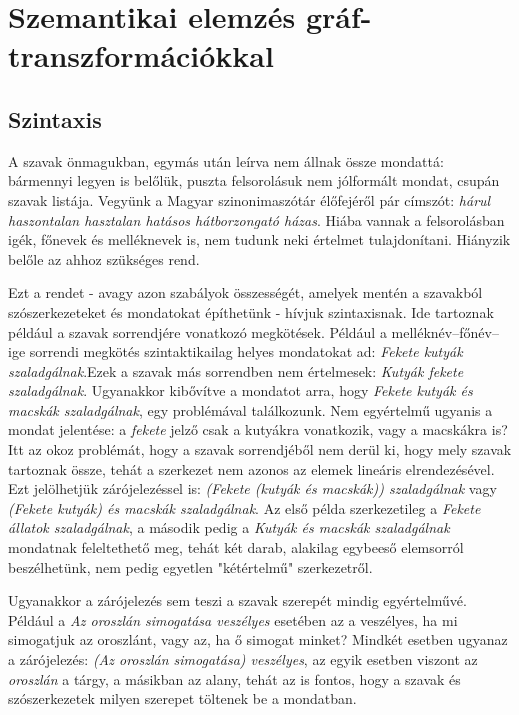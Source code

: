 \chapter{Szemantikai elemzés gráf-transzformációkkal}
\label{sec:spwgt}
\section{Szintaxis}
\label{sec:syntax}
A szavak önmagukban, egymás után leírva nem állnak össze mondattá: bármennyi legyen is belőlük, puszta felsorolásuk nem jólformált mondat, csupán szavak listája. Vegyünk a Magyar szinonimaszótár élőfejéről pár címszót: \textit{hárul haszontalan hasztalan hatásos hátborzongató házas}. Hiába vannak a felsorolásban igék, főnevek és melléknevek is, nem tudunk neki értelmet tulajdonítani. Hiányzik belőle az ahhoz szükséges rend.

Ezt a rendet - avagy azon szabályok összességét, amelyek mentén a szavakból szószerkezeteket és mondatokat építhetünk - hívjuk szintaxisnak. Ide tartoznak például a szavak sorrendjére vonatkozó megkötések.
Például a melléknév–főnév–ige sorrendi megkötés szintaktikailag helyes mondatokat ad: \textit{Fekete kutyák szaladgálnak}.Ezek a szavak más sorrendben nem értelmesek: \textit{Kutyák fekete szaladgálnak}. Ugyanakkor kibővítve a mondatot arra, hogy \textit{Fekete kutyák és macskák szaladgálnak}, egy problémával találkozunk. Nem egyértelmű ugyanis a mondat jelentése: a \textit{fekete} jelző csak a kutyákra vonatkozik, vagy a macskákra is?
Itt az okoz problémát, hogy a szavak sorrendjéből nem derül ki, hogy mely szavak tartoznak össze, tehát a szerkezet nem azonos az elemek lineáris elrendezésével.
Ezt jelölhetjük zárójelezéssel is: \textit{(Fekete (kutyák és macskák)) szaladgálnak} vagy \textit{(Fekete kutyák) és macskák szaladgálnak}. Az első példa szerkezetileg a \textit{Fekete állatok szaladgálnak}, a második pedig a \textit{Kutyák és macskák szaladgálnak} mondatnak feleltethető meg, tehát két darab, alakilag egybeeső elemsorról beszélhetünk, nem pedig egyetlen "kétértelmű" szerkezetről.

Ugyanakkor a zárójelezés sem teszi a szavak szerepét mindig egyértelművé. Például a \textit{Az oroszlán simogatása veszélyes} esetében az a veszélyes, ha mi simogatjuk az oroszlánt, vagy az, ha ő simogat minket? Mindkét esetben ugyanaz a zárójelezés: \textit{(Az oroszlán simogatása) veszélyes}, az egyik esetben viszont az \textit{oroszlán} a tárgy, a másikban az alany, tehát az is fontos, hogy a szavak és szószerkezetek milyen szerepet töltenek be a mondatban. \cite{Kenesei:2004} 


